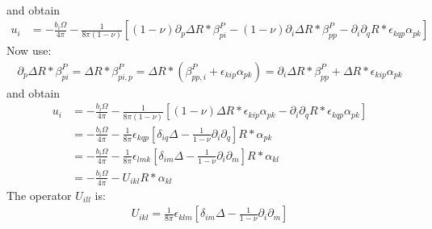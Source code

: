 \documentclass[10pt]{report}
\begin{document}
{\begin{align}
\end{align}
and obtain
\begin{align}
u_i&=-\frac{b_i\Omega}{4\pi}-\frac{1}{8\pi(1-\nu)}\left[(1-\nu)\partial_p\Delta R * \beta^P_{pi} -(1-\nu)\partial_i\Delta R * \beta^P_{pp}- \partial_i\partial_q R * \epsilon_{kqp}\alpha_{pk}\right]
\end{align}
Now use: 
\begin{align}
\partial_p\Delta R * \beta^P_{pi} = \Delta R * \beta^P_{pi,p} = \Delta R * \left(\beta^P_{pp,i}+\epsilon_{kip}\alpha_{pk}\right) =  \partial_i\Delta R * \beta^P_{pp}+ \Delta R * \epsilon_{kip}\alpha_{pk}
\end{align}
and obtain
\begin{align}
u_i&=-\frac{b_i\Omega}{4\pi}-\frac{1}{8\pi(1-\nu)}\left[(1-\nu)  \Delta R * \epsilon_{kip}\alpha_{pk} - \partial_i\partial_q R * \epsilon_{kqp}\alpha_{pk}\right]\nonumber\\
&=-\frac{b_i\Omega}{4\pi}-\frac{1}{8\pi}\epsilon_{kqp}\left[ \delta_{iq}\Delta  -\frac{1}{1-\nu} \partial_i\partial_q  \right] R * \alpha_{pk}\nonumber\\
&=-\frac{b_i\Omega}{4\pi}-\frac{1}{8\pi}\epsilon_{lmk}\left[ \delta_{im}\Delta  -\frac{1}{1-\nu} \partial_i\partial_m  \right] R * \alpha_{kl}\nonumber\\
&=-\frac{b_i\Omega}{4\pi}-U_{ikl} R * \alpha_{kl}
\end{align}
The operator $U_{ill}$ is:
\begin{align}
U_{ikl}=\frac{1}{8\pi}\epsilon_{klm}\left[ \delta_{im}\Delta  -\frac{1}{1-\nu} \partial_i\partial_m  \right]
\end{align}




}
\end{document}
